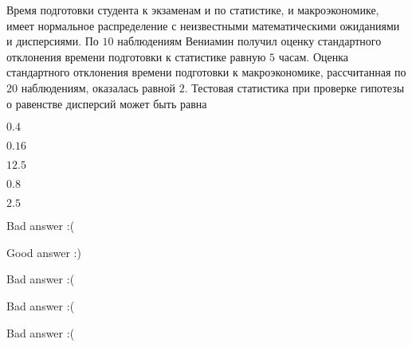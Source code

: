 
\begin{question}
Время подготовки студента к экзаменам и по статистике, и макроэкономике,
имеет нормальное распределение с неизвестными математическими ожиданиями
и дисперсиями. По \(10\) наблюдениям Вениамин получил оценку
стандартного отклонения времени подготовки к статистике равную \(5\)
часам. Оценка стандартного отклонения времени подготовки к
макроэкономике, рассчитанная по \(20\) наблюдениям, оказалась равной
\(2\). Тестовая статистика при проверке гипотезы о равенстве дисперсий
может быть равна
\begin{answerlist}
  \item \(0.4\)
  \item \(0.16\)
  \item \(12.5\)
  \item \(0.8\)
  \item \(2.5\)
\end{answerlist}
\end{question}

\begin{solution}
\begin{answerlist}
  \item Bad answer :(
  \item Good answer :)
  \item Bad answer :(
  \item Bad answer :(
  \item Bad answer :(
\end{answerlist}
\end{solution}


